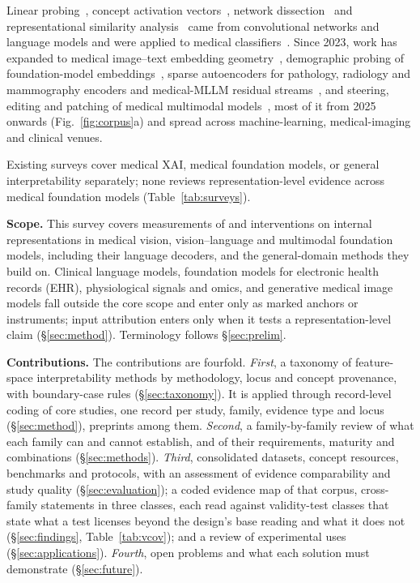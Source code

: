 Linear probing~\cite{alain2016understanding}, concept activation vectors~\cite{kim2018interpretability},
network dissection~\cite{bau2017network} and representational similarity analysis~\cite{kriegeskorte2008representational}
came from convolutional networks and language models and were applied to medical classifiers~\cite{lucieri2020interpretability}.
Since 2023, work has expanded to medical image--text embedding geometry~\cite{restrepo2026cone},
demographic probing of foundation-model embeddings~\cite{zheng2024demographic}, sparse autoencoders
for pathology, radiology and mammography encoders and medical-MLLM residual streams~\cite{bouzid2025insights,nakka2025mammosae,wesp2026sparse},
and steering, editing and patching of medical multimodal models~\cite{nooralahzadeh2026universal,zhu2026evaluating,sadanandan2026mechanistically},
most of it from 2025 onwards (Fig.~\ref{fig:corpus}a) and spread across machine-learning, medical-imaging and clinical
venues.

Existing surveys cover medical XAI, medical foundation models, or general interpretability separately; none
reviews representation-level evidence across medical foundation models (Table~\ref{tab:surveys}).

\textbf{Scope.} This survey covers measurements of and interventions on internal representations in
medical vision, vision--language and multimodal foundation models, including their language
decoders, and the general-domain methods they build on. Clinical language models, foundation models for
electronic health records (EHR), physiological signals and omics, and generative medical image models
fall outside the core scope and enter only as marked anchors or instruments; input attribution enters
only when it tests a representation-level claim (\S\ref{sec:method}). Terminology follows \S\ref{sec:prelim}.

\textbf{Contributions.} The contributions are fourfold. \textit{First}, a taxonomy of feature-space
interpretability methods by methodology, locus and concept provenance, with boundary-case rules
(\S\ref{sec:taxonomy}). It is applied through record-level coding of \Ncore{} core studies, one record per
study, family, evidence type and locus (\S\ref{sec:method}), \Npreprint{} preprints among them. \textit{Second}, a family-by-family
review of what each family can and cannot establish, and of their requirements, maturity and combinations
(\S\ref{sec:methods}). \textit{Third}, consolidated datasets, concept resources, benchmarks and protocols,
with an assessment of evidence comparability and study quality (\S\ref{sec:evaluation}); a coded evidence map of that corpus, \Fnrows{} cross-family statements in three classes, each
read against \Vnclasses{} validity-test classes
that state what a test licenses beyond the design's base reading and what it does not
(\S\ref{sec:findings}, Table~\ref{tab:vcov}); and a review of experimental uses
(\S\ref{sec:applications}). \textit{Fourth}, open problems and what each solution must demonstrate
(\S\ref{sec:future}).

